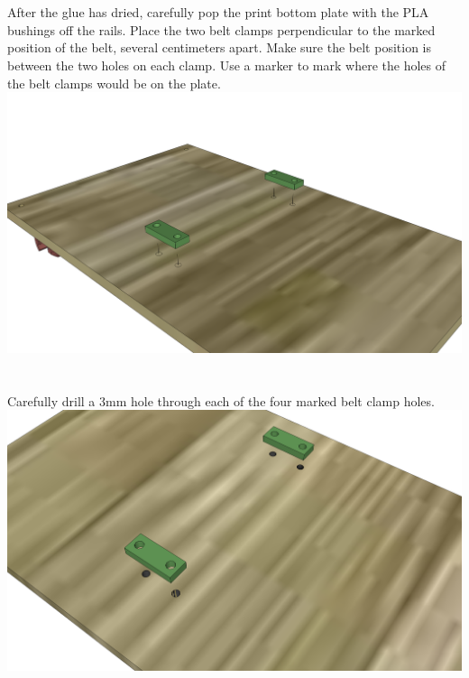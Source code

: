 \documentclass[twoside,a4paper,titlepage]{memoir}
\begin{document}
	\section{}
	After the glue has dried, carefully pop the print bottom plate with the PLA bushings off the rails. Place
	the two belt clamps perpendicular to the marked position of the belt, several centimeters apart. Make
	sure the belt position is between the two holes on each clamp. Use a marker to mark where the holes of
	the belt clamps would be on the plate.\\
	\includegraphics[width=1\linewidth]{graphics/ch6_21.png}
	
	\section{}
	Carefully drill a 3mm hole through each of the four marked belt clamp holes.\\
	\includegraphics[width=1\linewidth]{graphics/ch6_22.png}
	
\end{document}
